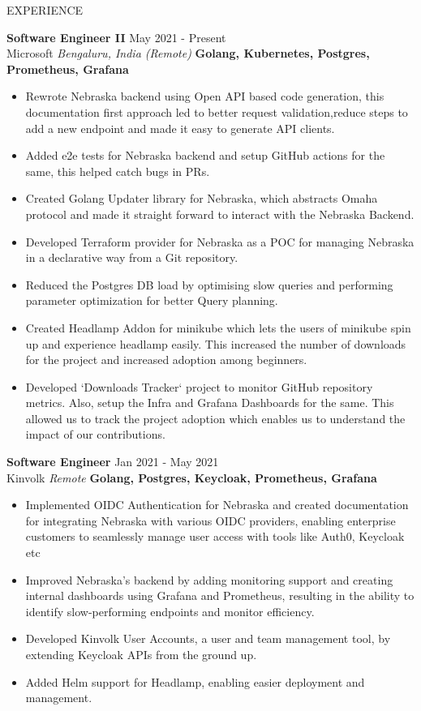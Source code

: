 \documentclass{resume} %
\begin{document}
\begin{rSection}{EXPERIENCE}

\textbf{Software Engineer II} \hfill May 2021 - Present\\
Microsoft \hfill \textit{Bengaluru, India (Remote)} \newline
\textbf{Golang, Kubernetes, Postgres, Prometheus, Grafana}
 \begin{itemize}
    \itemsep -3pt {} 
\item Rewrote Nebraska backend using Open API based code generation, this documentation first approach led to better request validation,reduce steps to add a new endpoint and made it easy to generate API clients.
\item Added e2e tests for Nebraska backend and setup GitHub actions for the same, this helped catch bugs in PRs.
\item Created Golang Updater library for Nebraska, which abstracts Omaha protocol and made it straight forward to interact with the Nebraska Backend.
\item Developed Terraform provider for Nebraska as a POC for managing Nebraska in a declarative way from a Git repository.
\item Reduced the Postgres DB load by optimising slow queries and performing parameter optimization for better Query planning.
\item Created Headlamp Addon for minikube which lets the users of minikube spin up and experience headlamp easily. This increased the number of downloads for the project and increased adoption among beginners.
\item Developed `Downloads Tracker` project to monitor GitHub repository metrics. Also, setup the Infra and Grafana Dashboards for the same. This allowed us to track the project adoption which enables us to understand the impact of our contributions.
 \end{itemize}
 
\textbf{Software Engineer} \hfill Jan 2021 - May 2021\\
Kinvolk \hfill \textit{Remote} \newline
\textbf{Golang, Postgres, Keycloak, Prometheus, Grafana}
 \begin{itemize}
    \itemsep -3pt {} 
\item Implemented OIDC Authentication for Nebraska and created documentation for integrating Nebraska with various OIDC providers, enabling enterprise customers to seamlessly manage user access with tools like Auth0, Keycloak etc
\item Improved Nebraska's backend by adding monitoring support and creating internal dashboards using Grafana and Prometheus, resulting in the ability to identify slow-performing endpoints and monitor efficiency.
\item Developed Kinvolk User Accounts, a user and team management tool, by extending Keycloak APIs from the ground up.
\item Added Helm support for Headlamp, enabling easier deployment and management.
 \end{itemize}



\end{rSection}
\end{document}

